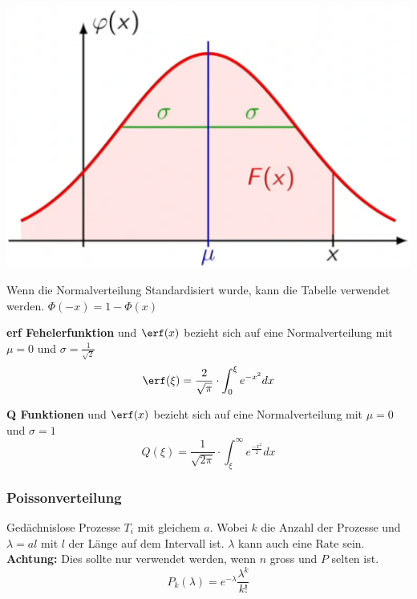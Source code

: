 \begin{center}
	\includegraphics[width=0.4\columnwidth]{Images/normalverteilung}
\end{center}

\noindent Wenn die Normalverteilung Standardisiert wurde, kann die Tabelle verwendet werden. $\Phi(-x) = 1 - \Phi(x)$


\textbf{erf Fehelerfunktion}  und 
$\erf(x)$ bezieht sich auf eine Normalverteilung mit $\mu = 0$ und $\sigma = \frac{1}{\sqrt{2}}$\\
	\[
\erf(\xi) = \frac{2}{\sqrt{\pi}}\cdot\int_{0}^{\xi}e^{-x^2}dx
\]


\textbf{Q Funktionen}  und 
$\erf(x)$ bezieht sich auf eine Normalverteilung mit $\mu = 0$ und $\sigma = 1$\\
	\[
Q(\xi) = \frac{1}{\sqrt{2\pi}}\cdot\int_{\xi}^{\infty}e^{\frac{-x^2}{2}}dx
\]

\subsubsection{Poissonverteilung}
Gedächnislose Prozesse $T_i$ mit gleichem $a$. Wobei $k$ die Anzahl der Prozesse und $\lambda = al$ mit $l$ der Länge auf dem Intervall ist. $\lambda$ kann auch eine Rate sein. \textbf{Achtung:} Dies sollte nur verwendet werden, wenn $n$ gross und $P$ selten ist.
\[
P_k(\lambda) = e^{-\lambda}\frac{\lambda^k}{k!}
\]
